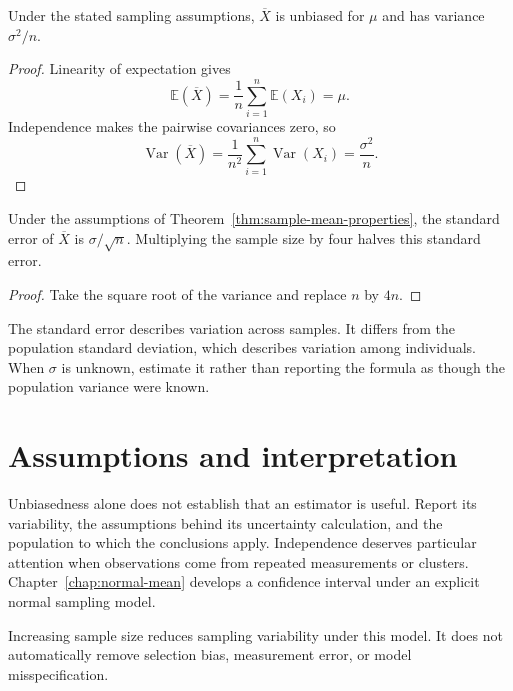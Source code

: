 \begin{theorem}
  \label{thm:sample-mean-properties}
  Under the stated sampling assumptions, $\overline{X}$ is unbiased for $\mu$
  and has variance $\sigma^2/n$.
\end{theorem}
\begin{proof}
  Linearity of expectation gives
  \[
    \mathbb{E}(\overline{X})
    = \frac{1}{n}\sum_{i=1}^{n}\mathbb{E}(X_i) = \mu.
  \]
  Independence makes the pairwise covariances zero, so
  \[
    \operatorname{Var}(\overline{X})
    = \frac{1}{n^2}\sum_{i=1}^{n}\operatorname{Var}(X_i)
    = \frac{\sigma^2}{n}.
  \]
\end{proof}
\begin{corollary}
  Under the assumptions of Theorem~\ref{thm:sample-mean-properties}, the
  standard error of $\overline{X}$ is $\sigma/\sqrt{n}$. Multiplying the
  sample size by four halves this standard error.
\end{corollary}
\begin{proof}
  Take the square root of the variance and replace $n$ by $4n$.
\end{proof}
The standard error describes variation across samples. It differs from the
population standard deviation, which describes variation among individuals.
When $\sigma$ is unknown, estimate it rather than reporting the formula as
though the population variance were known.


\section{Assumptions and interpretation}
Unbiasedness alone does not establish that an estimator is useful. Report its
variability, the assumptions behind its uncertainty calculation, and the
population to which the conclusions apply. Independence deserves particular
attention when observations come from repeated measurements or clusters.
Chapter~\ref{chap:normal-mean} develops a confidence interval under an explicit
normal sampling model.


\begin{remark}
  Increasing sample size reduces sampling variability under this model. It
  does not automatically remove selection bias, measurement error, or model
  misspecification.
\end{remark}
